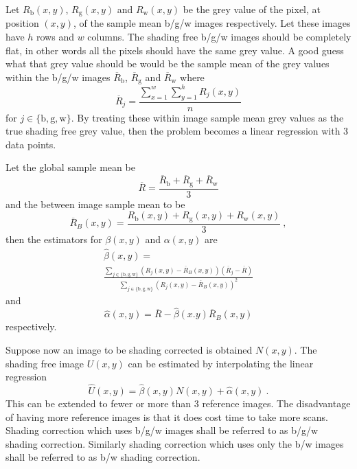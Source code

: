 \documentclass[a4paper]{proc}
\begin{document}
Let $R_\text{b}(x,y)$, $R_\text{g}(x,y)$ and $R_\text{w}(x,y)$ be the grey value of the pixel, at position $(x,y)$, of the sample mean b/g/w images respectively. Let these images have $h$ rows and $w$ columns. The shading free b/g/w images should be completely flat, in other words all the pixels should have the same grey value. A good guess what that grey value should be would be the sample mean of the grey values within the b/g/w images $\overline{R}_\text{b}$, $\overline{R}_\text{g}$ and $\overline{R}_\text{w}$ where
\begin{equation}
\overline{R}_j=\frac{\sum_{x=1}^w\sum_{y=1}^hR_j(x,y)}{n}
\end{equation}
for $j\in\{\text{b},\text{g},\text{w}\}$. By treating these within image sample mean grey values as the true shading free grey value, then the problem becomes a linear regression with 3 data points.

Let the global sample mean be
\begin{equation}
\overline{R}=\frac{\overline{R}_\text{b} + \overline{R}_\text{g} + \overline{R}_\text{w}}{3}
\end{equation}
and the between image sample mean to be
\begin{equation}
\overline{R}_B(x,y)=\frac{R_\text{b}(x,y) + R_\text{g}(x,y) + R_\text{w}(x,y)}{3} \ ,
\end{equation}
then the estimators for $\beta(x,y)$ and $\alpha(x,y)$ are
\begin{multline}
\widehat{\beta}(x,y)=
\\
\frac{\sum_{j\in\{\text{b},\text{g},\text{w}\}}\left(R_j(x,y)-\overline{R}_B(x,y)\right)\left(\overline{R}_j-\overline{R}\right)}{\sum_{j\in\{\text{b},\text{g},\text{w}\}}\left(R_j(x,y)-\overline{R}_B(x,y)\right)^2}
\end{multline}
and
\begin{equation}
\widehat{\alpha}(x,y) = \overline{R}-\widehat{\beta}(x.y)\overline{R}_B(x,y) 
\end{equation}
respectively.

Suppose now an image to be shading corrected is obtained $N(x,y)$. The shading free image $U(x,y)$ can be estimated by interpolating the linear regression
\begin{equation}
\widehat{U}(x,y) = \widehat{\beta}(x,y)N(x,y)+\widehat{\alpha}(x,y) \ .
\end{equation}
This can be extended to fewer or more than 3 reference images. The disadvantage of having more reference images is that it does cost time to take more scans. Shading correction which uses b/g/w images shall be referred to as b/g/w shading correction. Similarly shading correction which uses only the b/w images shall be referred to as b/w shading correction.
\end{document}
